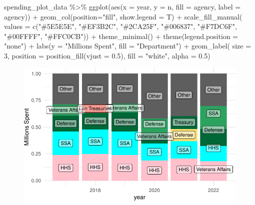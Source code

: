 \documentclass[
  letterpaper,
]{book}
\newenvironment{Shaded}{\begin{snugshade}}{\end{snugshade}}
\newcommand{\AttributeTok}[1]{\textcolor[rgb]{0.40,0.45,0.13}{#1}}
\newcommand{\DecValTok}[1]{\textcolor[rgb]{0.68,0.00,0.00}{#1}}
\newcommand{\FloatTok}[1]{\textcolor[rgb]{0.68,0.00,0.00}{#1}}
\newcommand{\FunctionTok}[1]{\textcolor[rgb]{0.28,0.35,0.67}{#1}}
\newcommand{\NormalTok}[1]{\textcolor[rgb]{0.00,0.23,0.31}{#1}}
\newcommand{\SpecialCharTok}[1]{\textcolor[rgb]{0.37,0.37,0.37}{#1}}
\newcommand{\StringTok}[1]{\textcolor[rgb]{0.13,0.47,0.30}{#1}}
\begin{document}
\begin{Shaded}
\begin{Highlighting}[]
\NormalTok{spending\_plot\_data }\SpecialCharTok{\%\textgreater{}\%} 
  \FunctionTok{ggplot}\NormalTok{(}\FunctionTok{aes}\NormalTok{(}\AttributeTok{x =}\NormalTok{ year, }\AttributeTok{y =}\NormalTok{ n, }\AttributeTok{fill =}\NormalTok{ agency, }\AttributeTok{label =}\NormalTok{ agency)) }\SpecialCharTok{+} 
  \FunctionTok{geom\_col}\NormalTok{(}\AttributeTok{position=}\StringTok{"fill"}\NormalTok{, }\AttributeTok{show.legend =}\NormalTok{ T) }\SpecialCharTok{+}
  \FunctionTok{scale\_fill\_manual}\NormalTok{( }
    \AttributeTok{values =} \FunctionTok{c}\NormalTok{(}\StringTok{"\#5E5E5E"}\NormalTok{, }\StringTok{"\#EF3B2C"}\NormalTok{, }\StringTok{"\#2CA25F"}\NormalTok{, }\StringTok{"\#006837"}\NormalTok{, }\StringTok{"\#F7DC6F"}\NormalTok{, }\StringTok{"\#00FFFF"}\NormalTok{, }\StringTok{"\#FFC0CB"}\NormalTok{)) }\SpecialCharTok{+}
  \FunctionTok{theme\_minimal}\NormalTok{() }\SpecialCharTok{+} 
  \FunctionTok{theme}\NormalTok{(}\AttributeTok{legend.position =} \StringTok{"none"}\NormalTok{) }\SpecialCharTok{+} 
  \FunctionTok{labs}\NormalTok{(}\AttributeTok{y =} \StringTok{"Millions Spent"}\NormalTok{, }\AttributeTok{fill =} \StringTok{"Department"}\NormalTok{) }\SpecialCharTok{+}
  \FunctionTok{geom\_label}\NormalTok{( }\AttributeTok{size =} \DecValTok{3}\NormalTok{, }\AttributeTok{position =} \FunctionTok{position\_fill}\NormalTok{(}\AttributeTok{vjust =} \FloatTok{0.5}\NormalTok{), }\AttributeTok{fill =} \StringTok{"white"}\NormalTok{, }\AttributeTok{alpha =} \FloatTok{0.5}\NormalTok{)}
\end{Highlighting}
\end{Shaded}

\begin{figure}[H]

{\centering \includegraphics{./data_viz_files/figure-pdf/unnamed-chunk-17-1.pdf}

}

\end{figure}
\end{document}
